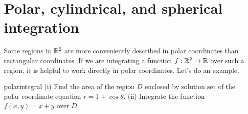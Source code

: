 \documentclass{watsonbook}
\begin{document}
\newpage 

\section{Polar, cylindrical, and spherical integration} \label{sec:polar_int}

Some regions in $\mathbb{R}^2$ are more conveniently described in polar
coordinates than rectangular coordinates. If we are integrating a
function $f: \mathbb{R}^2 \to \mathbb{R}$ over such a region, it is helpful to work
directly in polar coordinates. Let's do an example.

\begin{example}{}{polarintegral}
  (i) Find the area of the region $D$ enclosed by solution set of the polar
  coordinate equation $r = 1 + \cos \theta$. (ii) Integrate the
  function $f(x,y) = x + y$ over $D$. 
\end{example}
\end{document}
